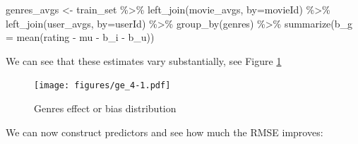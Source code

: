 \documentclass[
]{article}
\newenvironment{Shaded}{}{}
\newcommand{\AttributeTok}[1]{\textcolor[rgb]{0.49,0.56,0.16}{#1}}
\newcommand{\DecValTok}[1]{\textcolor[rgb]{0.25,0.63,0.44}{#1}}
\newcommand{\FloatTok}[1]{\textcolor[rgb]{0.25,0.63,0.44}{#1}}
\newcommand{\FunctionTok}[1]{\textcolor[rgb]{0.02,0.16,0.49}{#1}}
\newcommand{\NormalTok}[1]{#1}
\newcommand{\OtherTok}[1]{\textcolor[rgb]{0.00,0.44,0.13}{#1}}
\newcommand{\SpecialCharTok}[1]{\textcolor[rgb]{0.25,0.44,0.63}{#1}}
\newcommand{\StringTok}[1]{\textcolor[rgb]{0.25,0.44,0.63}{#1}}
\begin{document}
\begin{Shaded}
\begin{Highlighting}[]
\NormalTok{genres\_avgs }\OtherTok{\textless{}{-}}\NormalTok{ train\_set }\SpecialCharTok{\%\textgreater{}\%} 
  \FunctionTok{left\_join}\NormalTok{(movie\_avgs, }\AttributeTok{by=}\StringTok{\textquotesingle{}movieId\textquotesingle{}}\NormalTok{) }\SpecialCharTok{\%\textgreater{}\%} 
  \FunctionTok{left\_join}\NormalTok{(user\_avgs, }\AttributeTok{by=}\StringTok{\textquotesingle{}userId\textquotesingle{}}\NormalTok{) }\SpecialCharTok{\%\textgreater{}\%}
  \FunctionTok{group\_by}\NormalTok{(genres) }\SpecialCharTok{\%\textgreater{}\%}
  \FunctionTok{summarize}\NormalTok{(}\AttributeTok{b\_g =} \FunctionTok{mean}\NormalTok{(rating }\SpecialCharTok{{-}}\NormalTok{ mu }\SpecialCharTok{{-}}\NormalTok{ b\_i }\SpecialCharTok{{-}}\NormalTok{ b\_u))}
\end{Highlighting}
\end{Shaded}

We can see that these estimates vary substantially, see Figure
\ref{fig:model_4}

\begin{figure}
\centering
\texttt{[image: figures/ge\_4-1.pdf]}
\caption{Genres effect or bias distribution\label{fig:model_4}}
\end{figure}

We can now construct predictors and see how much the RMSE improves:

\begin{Shaded}
\end{Shaded}
\end{document}
